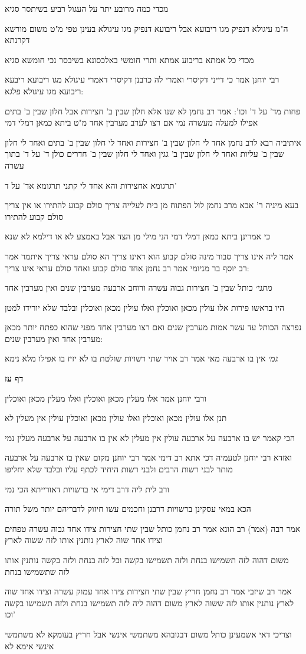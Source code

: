 \documentclass[12pt, openany]{book}
\newcommand{\sethebfont}{
\fontsize{10.5pt}{21.0pt} \selectfont
}
\newcommand{\textblock}[1]{
{\sethebfont #1\\}	
}
\newcommand{\sectname}{}
\newcommand{\newsection}[1]{
	\addcontentsline{toc}{section}{#1}
	\renewcommand{\sectname}{#1}	
	\vspace{-\baselineskip}
	\begin{center}
		\textbf{%
\fontsize{16pt}{16pt}\selectfont
			#1}
	\end{center}
	\vspace{-\baselineskip}
	\nopagebreak
}
\begin{document}
\textblock{מכדי כמה מרובע יתר על העגול רביע בשיתסר סגיא}
\textblock{ה"מ עיגולא דנפיק מגו ריבועא אבל ריבועא דנפיק מגו עיגולא בעינן טפי מ"ט משום מורשא דקרנתא}
\textblock{מכדי כל אמתא בריבוע אמתא ותרי חומשי באלכסונא בשיבסר נכי חומשא סגיא}
\textblock{רבי יוחנן אמר כי דייני דקיסרי ואמרי לה כרבנן דקיסרי דאמרי עיגולא מגו ריבועא ריבעא ריבועא מגו עיגולא פלגא:}
\textblock{פחות מד' על ד' וכו': אמר רב נחמן לא שנו אלא חלון שבין ב' חצירות אבל חלון שבין ב' בתים אפילו למעלה מעשרה נמי אם רצו לערב מערבין אחד מ"ט ביתא כמאן דמלי דמי}
\textblock{איתיביה רבא לרב נחמן אחד לי חלון שבין ב' חצירות ואחד לי חלון שבין ב' בתים ואחד לי חלון שבין ב' עליות ואחד לי חלון שבין ב' גגין ואחד לי חלון שבין ב' חדרים כולן ד' על ד' בתוך עשרה}
\textblock{תרגומא אחצירות והא אחד לי קתני תרגומא אד' על ד'}
\textblock{בעא מיניה ר' אבא מרב נחמן לול הפתוח מן בית לעלייה צריך סולם קבוע להתירו או אין צריך סולם קבוע להתירו}
\textblock{כי אמרינן ביתא כמאן דמלי דמי הני מילי מן הצד אבל באמצע לא או דילמא לא שנא}
\textblock{אמר ליה אינו צריך סבור מינה סולם קבוע הוא דאינו צריך הא סולם עראי צריך איתמר אמר רב יוסף בר מניומי אמר רב נחמן אחד סולם קבוע ואחד סולם עראי אינו צריך:}
\textblock{{\large\emph{מתני׳}} כותל שבין ב' חצירות גבוה עשרה ורוחב ארבעה מערבין שנים ואין מערבין אחד}
\textblock{היו בראשו פירות אלו עולין מכאן ואוכלין ואלו עולין מכאן ואוכלין ובלבד שלא יורידו למטן}
\textblock{נפרצה הכותל עד עשר אמות מערבין שנים ואם רצו מערבין אחד מפני שהוא כפתח יותר מכאן מערבין אחד ואין מערבין שנים:}
\textblock{{\large\emph{גמ׳}} אין בו ארבעה מאי אמר רב אויר שתי רשויות שולטת בו לא יזיז בו אפילו מלא נימא}
\newsection{דף עז}
\textblock{ורבי יוחנן אמר אלו מעלין מכאן ואוכלין ואלו מעלין מכאן ואוכלין}
\textblock{תנן אלו עולין מכאן ואוכלין ואלו עולין מכאן ואוכלין עולין אין מעלין לא}
\textblock{הכי קאמר יש בו ארבעה על ארבעה עולין אין מעלין לא אין בו ארבעה על ארבעה מעלין נמי}
\textblock{ואזדא רבי יוחנן לטעמיה דכי אתא רב דימי אמר רבי יוחנן מקום שאין בו ארבעה על ארבעה מותר לבני רשות הרבים ולבני רשות היחיד לכתף עליו ובלבד שלא יחליפו}
\textblock{ורב לית ליה דרב דימי אי ברשויות דאורייתא הכי נמי}
\textblock{הכא במאי עסקינן ברשויות דרבנן וחכמים עשו חיזוק לדבריהם יותר משל תורה}
\textblock{אמר רבה (אמר) רב הונא אמר רב נחמן כותל שבין שתי חצירות צידו אחד גבוה עשרה טפחים וצידו אחד שוה לארץ נותנין אותו לזה ששוה לארץ}
\textblock{משום דהוה לזה תשמישו בנחת ולזה תשמישו בקשה וכל לזה בנחת ולזה בקשה נותנין אותו לזה שתשמישו בנחת}
\textblock{אמר רב שיזבי אמר רב נחמן חריץ שבין שתי חצירות צידו אחד עמוק עשרה וצידו אחד שוה לארץ נותנין אותו לזה ששוה לארץ משום דהוה ליה לזה תשמישו בנחת ולזה תשמישו בקשה וכו'}
\textblock{וצריכי דאי אשמעינן כותל משום דבגובהא משתמשי אינשי אבל חריץ בעומקא לא משתמשי אינשי אימא לא}
\end{document}
